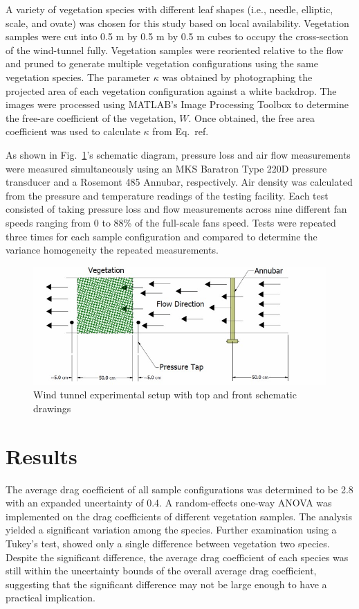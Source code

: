 \documentclass[a4paper,11pt]{article}
\begin{document}
A variety of vegetation species with different leaf shapes (i.e., needle, elliptic, scale, and ovate) was chosen for this study based on local availability. Vegetation samples were cut into 0.5 \si{m} by 0.5 \si{m} by 0.5 \si{m} cubes to occupy the cross-section of the wind-tunnel fully. Vegetation samples were reoriented relative to the flow and pruned to generate multiple vegetation configurations using the same vegetation species. The parameter $\kappa$ was obtained by photographing the projected area of each vegetation configuration against a white backdrop. The images were processed using MATLAB’s Image Processing Toolbox to determine the free-are coefficient of the vegetation, $W$. Once obtained, the free area coefficient was used to calculate $\kappa$ from Eq.~ref{}.

As shown in Fig.~\ref{fig:WindtunnelPic}’s schematic diagram, pressure loss and air flow measurements were measured simultaneously using an MKS Baratron Type 220D pressure transducer and a Rosemont 485 Annubar, respectively. Air density was calculated from the pressure and temperature readings of the testing facility. Each test consisted of taking pressure loss and flow measurements across nine different fan speeds ranging from 0 to 88\% of the full-scale fans speed. Tests were repeated three times for each sample configuration and compared to determine the variance homogeneity the repeated measurements. 

\begin{figure} [!]
	\centering 	
    \includegraphics[width=\textwidth,keepaspectratio]{Picture6a.jpg}
	\caption[Wind tunnel experimental setup]{Wind tunnel experimental setup with top and front schematic drawings }
	\label{fig:WindtunnelPic}
\end{figure}

\section{Results}
The average drag coefficient of all sample configurations was determined to be 2.8 with an expanded uncertainty of 0.4. A random-effects one-way ANOVA was implemented on the drag coefficients of different vegetation samples. The analysis yielded a significant variation among the species. Further examination using a Tukey’s test, showed only a single difference between vegetation two species. Despite the significant difference, the average drag coefficient of each species was still within the uncertainty bounds of the overall average drag coefficient, suggesting that the significant difference may not be large enough to have a practical implication. 
\end{document}
